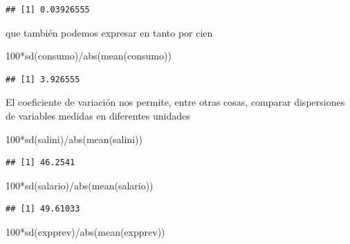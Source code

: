 \documentclass[
]{book}
\newenvironment{Shaded}{\begin{snugshade}}{\end{snugshade}}
\newcommand{\DecValTok}[1]{\textcolor[rgb]{0.00,0.00,0.81}{#1}}
\newcommand{\FunctionTok}[1]{\textcolor[rgb]{0.00,0.00,0.00}{#1}}
\newcommand{\NormalTok}[1]{#1}
\newcommand{\SpecialCharTok}[1]{\textcolor[rgb]{0.00,0.00,0.00}{#1}}
\theoremstyle{break}
\theoremstyle{nonumberplain}
\begin{document}
\begin{verbatim}
## [1] 0.03926555
\end{verbatim}

que también podemos expresar en tanto por cien

\begin{Shaded}
\begin{Highlighting}[]
\DecValTok{100}\SpecialCharTok{*}\FunctionTok{sd}\NormalTok{(consumo)}\SpecialCharTok{/}\FunctionTok{abs}\NormalTok{(}\FunctionTok{mean}\NormalTok{(consumo))}
\end{Highlighting}
\end{Shaded}

\begin{verbatim}
## [1] 3.926555
\end{verbatim}

El coeficiente de variación nos permite, entre otras cosas, comparar dispersiones de
variables medidas en diferentes unidades

\begin{Shaded}
\begin{Highlighting}[]
\DecValTok{100}\SpecialCharTok{*}\FunctionTok{sd}\NormalTok{(salini)}\SpecialCharTok{/}\FunctionTok{abs}\NormalTok{(}\FunctionTok{mean}\NormalTok{(salini))}
\end{Highlighting}
\end{Shaded}

\begin{verbatim}
## [1] 46.2541
\end{verbatim}

\begin{Shaded}
\begin{Highlighting}[]
\DecValTok{100}\SpecialCharTok{*}\FunctionTok{sd}\NormalTok{(salario)}\SpecialCharTok{/}\FunctionTok{abs}\NormalTok{(}\FunctionTok{mean}\NormalTok{(salario))}
\end{Highlighting}
\end{Shaded}

\begin{verbatim}
## [1] 49.61033
\end{verbatim}

\begin{Shaded}
\begin{Highlighting}[]
\DecValTok{100}\SpecialCharTok{*}\FunctionTok{sd}\NormalTok{(expprev)}\SpecialCharTok{/}\FunctionTok{abs}\NormalTok{(}\FunctionTok{mean}\NormalTok{(expprev))}
\end{Highlighting}
\end{Shaded}
\end{document}
